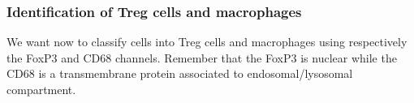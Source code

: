 \documentclass[a4paper,DIV=17,dvipsnames,headsepline]{scrartcl}
\begin{document}
\begin{enumerate}
    
\end{enumerate}

\subsubsection{Identification of Treg cells and macrophages}
We want now to classify cells into Treg cells and macrophages using respectively the FoxP3 and CD68 channels. Remember that the FoxP3 is nuclear while the CD68 is a transmembrane protein associated to endosomal/lysosomal compartment. 
\end{document}
